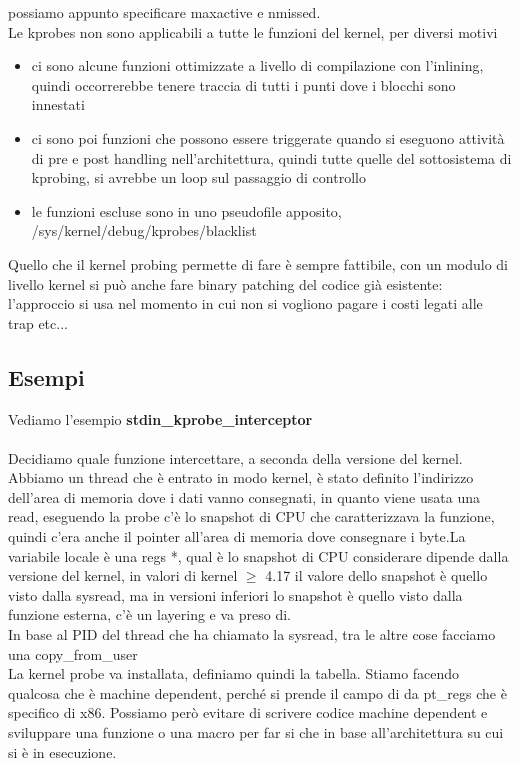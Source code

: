 \documentclass[12pt, oneside]{extbook}
\begin{document}
possiamo appunto specificare maxactive e nmissed.\\Le kprobes non sono applicabili a tutte le funzioni del kernel, per diversi motivi
\begin{itemize}
\item ci sono alcune funzioni ottimizzate a livello di compilazione con l'inlining, quindi occorrerebbe tenere traccia di tutti i punti dove i blocchi sono innestati
\item ci sono poi funzioni che possono essere triggerate quando si eseguono attività di pre e post handling nell'architettura, quindi tutte quelle del sottosistema di kprobing, si avrebbe un loop sul passaggio di controllo
\item le funzioni escluse sono in uno pseudofile apposito, \textsf{/sys/kernel/debug/kprobes/blacklist}
\end{itemize}
Quello che il kernel probing permette di fare è sempre fattibile, con un modulo di livello kernel si può anche fare binary patching del codice già esistente: l'approccio si usa nel momento in cui non si vogliono pagare i costi legati alle trap etc...
\subsection*{Esempi}
Vediamo l'esempio \textbf{stdin\_kprobe\_interceptor}\\\\Decidiamo quale funzione intercettare, a seconda della versione del kernel.\\Abbiamo un thread che è entrato in modo kernel, è stato definito l'indirizzo dell'area di memoria dove i dati vanno consegnati, in quanto viene usata una read, eseguendo la probe c'è lo snapshot di CPU che caratterizzava la funzione, quindi c'era anche il pointer all'area di memoria dove consegnare i byte.La variabile locale è una regs *, qual è lo snapshot di CPU considerare dipende dalla versione del kernel, in valori di kernel $\geq$ 4.17 il valore dello snapshot è quello visto dalla sysread, ma in versioni inferiori lo snapshot è quello visto dalla funzione esterna, c'è un layering e va preso di.\\In base al PID del thread che ha chiamato la sysread, tra le altre cose facciamo una copy\_from\_user\\La kernel probe va installata, definiamo quindi la tabella. Stiamo facendo qualcosa che è machine dependent, perché si prende il campo di da pt\_regs che è specifico di x86. Possiamo però evitare di scrivere codice machine dependent e sviluppare una funzione o una macro per far si che in base all'architettura su cui si è in esecuzione.
\end{document}
